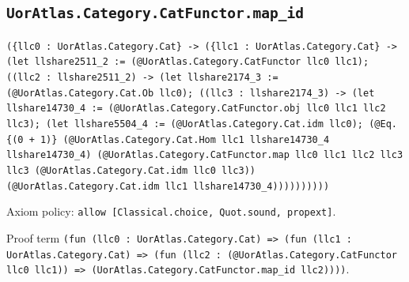 \documentclass[11pt]{article}
\begin{document}
\subsection*{\texttt{UorAtlas.Category.CatFunctor.map\_id}}
\noindent\texttt{(\{llc0 : UorAtlas.Category.Cat\} -> (\{llc1 : UorAtlas.Category.Cat\} -> (let llshare2511\_2 := (@UorAtlas.Category.CatFunctor llc0 llc1); ((llc2 : llshare2511\_2) -> (let llshare2174\_3 := (@UorAtlas.Category.Cat.Ob llc0); ((llc3 : llshare2174\_3) -> (let llshare14730\_4 := (@UorAtlas.Category.CatFunctor.obj llc0 llc1 llc2 llc3); (let llshare5504\_4 := (@UorAtlas.Category.Cat.idm llc0); (@Eq.\{(0 + 1)\} (@UorAtlas.Category.Cat.Hom llc1 llshare14730\_4 llshare14730\_4) (@UorAtlas.Category.CatFunctor.map llc0 llc1 llc2 llc3 llc3 (@UorAtlas.Category.Cat.idm llc0 llc3)) (@UorAtlas.Category.Cat.idm llc1 llshare14730\_4))))))))))}\par
\noindent Axiom policy: \texttt{allow [Classical.choice, Quot.sound, propext]}.\par
\noindent Proof term \texttt{(fun (llc0 : UorAtlas.Category.Cat) => (fun (llc1 : UorAtlas.Category.Cat) => (fun (llc2 : (@UorAtlas.Category.CatFunctor llc0 llc1)) => (UorAtlas.Category.CatFunctor.map\_id llc2))))}.\par
\end{document}
